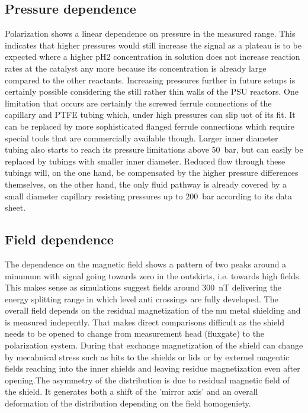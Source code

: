         \subsection{Pressure dependence}
            Polarization shows a linear dependence on pressure in the measured range. This indicates that higher pressures would still increase the signal as a plateau is to be expected where a higher pH2 concentration in solution does not increase reaction rates at the catalyst any more because its concentration is already large compared to the other reactants. Increasing pressures further in future setups is certainly possible considering the still rather thin walls of the PSU reactors. One limitation that occurs are certainly the screwed ferrule connections of the capillary and PTFE tubing which, under high pressures can slip uot of its fit. It can be replaced by more sophisticated flanged ferrule connections which require special tools that are commercially available though. Larger inner diameter tubing also starts to reach its pressure limitations above \SI{50}{\bar}, but can easily be replaced by tubings with smaller inner diameter. Reduced flow through these tubings will, on the one hand, be compensated by the higher pressure differences themselves, on the other hand, the only fluid pathway is already covered by a small diameter capillary resisting pressures up to \SI{200}{\bar} according to its data sheet.
        \subsection{Field dependence}
            The dependence on the magnetic field shows a pattern of two peaks around a minumum with signal going towards zero in the outskirts, i.e. towards high fields. This makes sense as simulations suggest fields around \SI{300}{\nano\tesla} delivering the energy splitting range in which level anti crossings are fully developed. The overall field depends on the residual magnetization of the mu metal shielding and is measured indepently. That makes direct comparisons difficult as the shield needs to be opened to change from measurement head (fluxgate) to the polarization system. During that exchange magnetization of the shield can change by mecahnical stress such as hits to the shields or lids or by externel magentic fields reaching into the inner shields and leaving residue magnetization even after opening.The asymmetry of the distribution is due to residual magnetic field of the shield. It generates both a shift of the 'mirror axis' and an overall deformation of the distribution depending on the field homogeniety.


